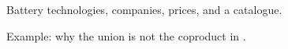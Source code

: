 \begin{example}
  \begin{figure}[tbh]
    \begin{center}
    \end{center}
    \caption{Battery technologies, companies, prices, and a catalogue.}
    \label{fig:coprod_batteries_1}
  \end{figure}

  \begin{figure}[tbh]
    \begin{center}
    \end{center}
    \caption{Example: why the union is not the coproduct in \Set.}
    \label{fig:coprod_batteries_2}
  \end{figure}



\end{example}
